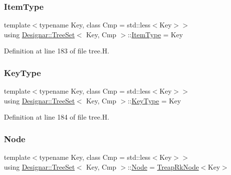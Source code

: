 \subsubsection{\texorpdfstring{Item\+Type}{ItemType}}
{\footnotesize\ttfamily template$<$typename Key, class Cmp = std\+::less$<$\+Key$>$$>$ \\
using \hyperlink{class_designar_1_1_tree_set}{Designar\+::\+Tree\+Set}$<$ Key, Cmp $>$\+::\hyperlink{class_designar_1_1_tree_set_a3d4237612f151579b02ff5c7735df07a}{Item\+Type} =  Key}



Definition at line 183 of file tree.\+H.

\mbox{\label{class_designar_1_1_tree_set_a28d9821de526b7d05f199b2d5d308335}} 
\subsubsection{\texorpdfstring{Key\+Type}{KeyType}}
{\footnotesize\ttfamily template$<$typename Key, class Cmp = std\+::less$<$\+Key$>$$>$ \\
using \hyperlink{class_designar_1_1_tree_set}{Designar\+::\+Tree\+Set}$<$ Key, Cmp $>$\+::\hyperlink{class_designar_1_1_tree_set_a28d9821de526b7d05f199b2d5d308335}{Key\+Type} =  Key}



Definition at line 184 of file tree.\+H.

\mbox{\label{class_designar_1_1_tree_set_a7409a9c1545c0e9e2fd6b84120713c99}} 
\subsubsection{\texorpdfstring{Node}{Node}}
{\footnotesize\ttfamily template$<$typename Key, class Cmp = std\+::less$<$\+Key$>$$>$ \\
using \hyperlink{class_designar_1_1_tree_set}{Designar\+::\+Tree\+Set}$<$ Key, Cmp $>$\+::\hyperlink{class_designar_1_1_tree_set_a7409a9c1545c0e9e2fd6b84120713c99}{Node} =  \hyperlink{class_designar_1_1_treap_rk_node}{Treap\+Rk\+Node}$<$Key$>$}



